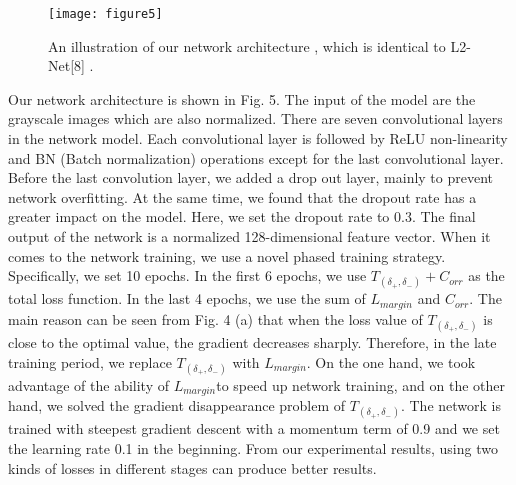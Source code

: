 \documentclass[letterpaper, 10 pt, conference]{ieeeconf}  %
\begin{document}
\begin{figure}[h]
\centering
\texttt{[image: figure5]}
\caption{An illustration of our  network architecture , which is identical to L2-Net[8] .}
\end{figure}

Our network architecture is shown in Fig. 5. The input of the model are the grayscale images which are also normalized. There are seven convolutional layers in the network model. Each convolutional layer is followed by ReLU non-linearity and BN (Batch normalization) operations except for the last convolutional layer. Before the last convolution layer, we added a drop out layer, mainly to prevent network overfitting. At the same time, we found that the dropout rate has a greater impact on the model. Here, we set the dropout rate to 0.3. The final output of the network is a normalized 128-dimensional feature vector.  
When it comes to the network training, we use a novel phased training strategy.  Specifically, we set 10 epochs. In the first 6 epochs, we use $T_{(\delta _{+},\delta _{-})} + C_{orr}$ as the total loss function. In the last 4 epochs, we use the sum of $L_{margin}$ and $C_{orr}$. The main reason can be seen from Fig. 4 (a) that when the loss value of $T_{(\delta _{+},\delta _{-})}$  is close to the optimal value, the gradient decreases sharply. Therefore, in the late training period, we replace $T_{(\delta _{+},\delta _{-})}$ with $L_{margin}$. On the one hand, we took advantage of the  ability of $L_{margin}$to speed up network training, and on the other hand, we solved the gradient disappearance problem of  $T_{(\delta _{+},\delta _{-})}$. The network is trained with steepest gradient descent with a momentum term of 0.9 and we set the learning rate 0.1 in the beginning. From our experimental results, using two kinds of losses in different stages can produce better results.
\end{document}
